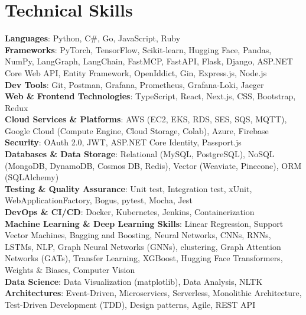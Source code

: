 \documentclass[letterpaper,11pt]{article}
\begin{document}
\section{Technical Skills}
\begin{itemize}[leftmargin=0.15in, label={}]
    \small{\item{
     \textbf{Languages}{: Python, C\#, Go, JavaScript, Ruby} \\
     \textbf{Frameworks}{: PyTorch, TensorFlow, Scikit-learn, Hugging Face, Pandas, NumPy, LangGraph, LangChain, FastMCP, FastAPI, Flask, Django, ASP.NET Core Web API, Entity Framework, OpenIddict, Gin, Express.js, Node.js} \\
     \textbf{Dev Tools}{: Git, Postman, Grafana, Prometheus, Grafana-Loki, Jaeger} \\
     \textbf{Web \& Frontend Technologies}{: TypeScript, React, Next.js, CSS, Bootstrap, Redux} \\
     \textbf{Cloud Services \& Platforms}{: AWS (EC2, EKS, RDS, SES, SQS, MQTT), Google Cloud (Compute Engine, Cloud Storage, Colab), Azure, Firebase} \\
     \textbf{Security}{: OAuth 2.0, JWT, ASP.NET Core Identity, Passport.js} \\
    \textbf{Databases \& Data Storage}{: Relational (MySQL, PostgreSQL), NoSQL (MongoDB, DynamoDB, Cosmos DB, Redis), Vector (Weaviate, Pinecone), ORM (SQLAlchemy)} \\

     \textbf{Testing \& Quality Assurance}{: Unit test, Integration test, xUnit, WebApplicationFactory, Bogus, pytest, Mocha, Jest} \\
     \textbf{DevOps \& CI/CD}{: Docker, Kubernetes, Jenkins, Containerization} \\
    \textbf{Machine Learning \& Deep Learning Skills}{: Linear Regression, Support Vector Machines, Bagging and Boosting, Neural Networks, CNNs, RNNs, LSTMs, NLP, Graph Neural Networks (GNNs), clustering, Graph Attention Networks (GATs), Transfer Learning, XGBoost, Hugging Face Transformers, Weights \& Biases, Computer Vision}\\
     \textbf{Data Science}{: Data Visualization (matplotlib), Data Analysis, NLTK} \\
     \textbf{Architectures}{: Event-Driven, Microservices, Serverless, Monolithic Architecture, Test-Driven Development (TDD), Design patterns, Agile, REST API} \\
    }}
\end{itemize}



\end{document}
